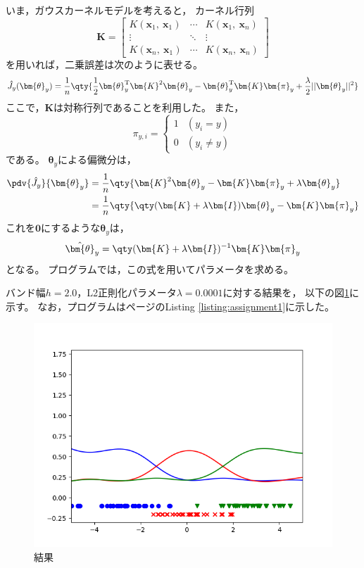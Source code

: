 \documentclass[class=jsarticle, crop=false, dvipdfmx, fleqn]{standalone}
\begin{document}
いま，ガウスカーネルモデルを考えると，
カーネル行列
\begin{equation}
    \bm{K} =
        \begin{bmatrix}
            K(\bm{x}_1,\ \bm{x}_1) & \cdots & K(\bm{x}_1,\ \bm{x}_n) \\
            \vdots & \ddots & \vdots \\
            K(\bm{x}_n,\ \bm{x}_1) & \cdots & K(\bm{x}_n,\ \bm{x}_n)
        \end{bmatrix}
\end{equation}
を用いれば，二乗誤差は次のように表せる。
\begin{equation}
    \hat{J}_y (\bm{\theta}_y)
        = \frac{1}{n} \qty{
            \frac{1}{2} \bm{\theta}_y^\mathrm{T} \bm{K}^2 \bm{\theta}_y - \bm{\theta}_y^\mathrm{T} \bm{K} \bm{\pi}_y + \frac{\lambda}{2} ||\bm{\theta}_y||^2
            }
\end{equation}
ここで，\(\bm{K}\)は対称行列であることを利用した。
また，
\begin{equation}
    \pi_{y, i} =
        \begin{cases}
            1 & (y_i = y) \\
            0 & (y_i \neq y)
        \end{cases}
\end{equation}
である。
\(\bm{\theta}_y\)による偏微分は，
\begin{align}
    \pdv{\hat{J}_y}{\bm{\theta}_y}
        & = \frac{1}{n} \qty{
            \bm{K}^2 \bm{\theta}_y - \bm{K} \bm{\pi}_y + \lambda \bm{\theta}_y
            } \\
        & = \frac{1}{n} \qty{
            \qty(\bm{K} + \lambda \bm{I}) \bm{\theta}_y - \bm{K} \bm{\pi}_y
            }
\end{align}
これを\(\bm{0}\)にするような\(\bm{\theta}_y\)は，
\begin{equation}
    \hat{\bm{\theta}}_y = \qty(\bm{K} + \lambda \bm{I})^{-1} \bm{K} \bm{\pi}_y
\end{equation}
となる。
プログラムでは，この式を用いてパラメータを求める。

バンド幅\(h = 2.0\)，L2正則化パラメータ\(\lambda = 0.0001\)に対する結果を，
以下の図\ref{fig:result}に示す。
なお，プログラムは\pageref{listing:assignment1}ページのListing \ref{listing:assignment1}に示した。

\begin{figure}[H]
    \centering
    \includegraphics[clip, width=12cm]{../figures/assignment1_result}
    \caption{結果}
    \label{fig:result}
\end{figure}
\end{document}
